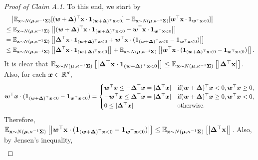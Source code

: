\begin{proof}[Proof of Claim A.1]
To this end, we start by
\begin{align*}
    &\quad \left | \mathbb{E}_{{\mathbf{x}} \sim N({\bm{\mu}}, \kappa^{-1} {\bm{\Sigma}})} [({\bm{w}}+{\bm{\Delta}})^\top {\mathbf{x}} \cdot {\bm{1}}_{({\bm{w}}+{\bm{\Delta}})^\top {\mathbf{x}}<0}]-\mathbb{E}_{{\mathbf{x}} \sim N({\bm{\mu}}, \kappa^{-1}{\bm{\Sigma}})} [{\bm{w}}^\top {\mathbf{x}} \cdot {\bm{1}}_{{\bm{w}}^\top {\mathbf{x}}<0}]\right|\\
    &\leq \mathbb{E}_{{\mathbf{x}} \sim N({\bm{\mu}}, \kappa^{-1} {\bm{\Sigma}})}\left[ \left| ({\bm{w}}+{\bm{\Delta}})^\top {\mathbf{x}} \cdot {\bm{1}}_{({\bm{w}}+{\bm{\Delta}})^\top {\mathbf{x}}<0}- {\bm{w}}^\top {\mathbf{x}} \cdot {\bm{1}}_{{\bm{w}}^\top {\mathbf{x}}<0}\right| \right]\\
    &=  \mathbb{E}_{{\mathbf{x}} \sim N({\bm{\mu}}, \kappa^{-1} {\bm{\Sigma}})}\left[ \left| {\bm{\Delta}} ^\top {\mathbf{x}} \cdot {\bm{1}}_{({\bm{w}}+{\bm{\Delta}})^\top {\mathbf{x}} <0} + {\bm{w}}^\top {\mathbf{x}} \cdot ({\bm{1}}_{({\bm{w}}+{\bm{\Delta}})^\top {\mathbf{x}} <0} - {\bm{1}}_{{\bm{w}}^\top {\mathbf{x}} <0})\right| \right]\\
    &\leq \mathbb{E}_{{\mathbf{x}} \sim N({\bm{\mu}}, \kappa^{-1} {\bm{\Sigma}})}\left[ \left| {\bm{\Delta}} ^\top {\mathbf{x}} \cdot {\bm{1}}_{({\bm{w}}+{\bm{\Delta}})^\top {\mathbf{x}} <0} \right| \right]+\mathbb{E}_{{\mathbf{x}} \sim N({\bm{\mu}}, \kappa^{-1} {\bm{\Sigma}})}\left[ \left| {\bm{w}}^\top {\mathbf{x}} \cdot ({\bm{1}}_{({\bm{w}}+{\bm{\Delta}})^\top {\mathbf{x}} <0} - {\bm{1}}_{{\bm{w}}^\top {\mathbf{x}} <0})\right| \right].
\end{align*}
It is clear that $\mathbb{E}_{{\mathbf{x}} \sim N({\bm{\mu}}, \kappa^{-1} {\bm{\Sigma}})}\left[ \left| {\bm{\Delta}} ^\top {\mathbf{x}} \cdot {\bm{1}}_{({\bm{w}}+{\bm{\Delta}})^\top {\mathbf{x}} <0} \right| \right] \leq \mathbb{E}_{{\mathbf{x}} \sim N({\bm{\mu}}, \kappa^{-1} {\bm{\Sigma}})}\left[ \left| {\bm{\Delta}} ^\top {\mathbf{x}}\right| \right]$. Also, for each ${\bm{x}} \in \mathbb{R}^d$,
\begin{align*}
    {\bm{w}}^\top {\bm{x}} \cdot ({\bm{1}}_{({\bm{w}}+{\bm{\Delta}})^\top {\bm{x}} <0} - {\bm{1}}_{{\bm{w}}^\top {\bm{x}} <0}) = 
    \begin{cases}
    {\bm{w}}^\top {\bm{x}} \leq -{\bm{\Delta}}^\top {\bm{x}} = |{\bm{\Delta}} ^\top {\bm{x}}| &\text{if} ({\bm{w}}+{\bm{\Delta}})^\top {\bm{x}} <0, {\bm{w}}^\top {\bm{x}} \geq 0,\\
    -{\bm{w}}^\top {\bm{x}} \leq {\bm{\Delta}}^\top {\bm{x}} = |{\bm{\Delta}} ^\top {\bm{x}}| &\text{if} ({\bm{w}}+{\bm{\Delta}})^\top {\bm{x}} \geq0, {\bm{w}}^\top {\bm{x}}< 0,\\
    0 \leq |{\bm{\Delta}} ^\top {\bm{x}}| &\text{otherwise}.
    \end{cases}
\end{align*}
Therefore, $\mathbb{E}_{{\mathbf{x}} \sim N({\bm{\mu}}, \kappa^{-1} {\bm{\Sigma}})}\left[ \left| {\bm{w}}^\top {\mathbf{x}} \cdot ({\bm{1}}_{({\bm{w}}+{\bm{\Delta}})^\top {\mathbf{x}} <0} - {\bm{1}}_{{\bm{w}}^\top {\mathbf{x}} <0})\right| \right] \leq \mathbb{E}_{{\mathbf{x}} \sim N({\bm{\mu}}, \kappa^{-1} {\bm{\Sigma}})}\left[ \left| {\bm{\Delta}} ^\top {\mathbf{x}}\right| \right]$. Also, by Jensen's inequality,
\begin{align*}

\end{align*}
\end{proof}

